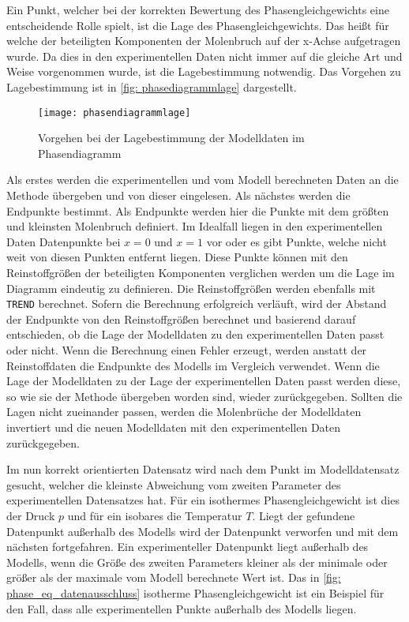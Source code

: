 \documentclass[../thesis.tex]{subfiles}
\begin{document}
Ein Punkt, welcher bei der korrekten Bewertung des Phasengleichgewichts eine entscheidende Rolle spielt, ist die Lage des Phasengleichgewichts. Das heißt für welche der beteiligten Komponenten der Molenbruch auf der x-Achse aufgetragen wurde. Da dies in den experimentellen Daten nicht immer auf die gleiche Art und Weise vorgenommen wurde, ist die Lagebestimmung notwendig. Das Vorgehen zu Lagebestimmung ist in \autoref{fig: phasediagrammlage} dargestellt.

\begin{figure}[htb]
	\centering
	\texttt{[image: phasendiagrammlage]}
	\caption{Vorgehen bei der Lagebestimmung der Modelldaten im Phasendiagramm}
	\label{fig: phasediagrammlage}
\end{figure}

Als erstes werden die experimentellen und vom Modell berechneten Daten an die Methode übergeben und von dieser eingelesen. Als nächstes werden die Endpunkte bestimmt. Als Endpunkte werden hier die Punkte mit dem größten und kleinsten Molenbruch definiert. Im Idealfall liegen in den experimentellen Daten Datenpunkte bei $x = 0$ und $ x = 1$ vor oder es gibt Punkte, welche nicht weit von diesen Punkten entfernt liegen. Diese Punkte können mit den Reinstoffgrößen der beteiligten Komponenten verglichen werden um die Lage im Diagramm eindeutig zu definieren. Die Reinstoffgrößen werden ebenfalls mit \texttt{TREND} berechnet. Sofern die Berechnung erfolgreich verläuft, wird der Abstand der Endpunkte von den Reinstoffgrößen berechnet und basierend darauf entschieden, ob die Lage der  Modelldaten zu den experimentellen Daten passt oder nicht. Wenn die Berechnung einen Fehler erzeugt, werden anstatt der Reinstoffdaten die Endpunkte des Modells im Vergleich verwendet. Wenn die Lage der Modelldaten zu der Lage der experimentellen Daten passt werden diese, so wie sie der Methode übergeben worden sind, wieder zurückgegeben. Sollten die Lagen nicht zueinander passen, werden die Molenbrüche der Modelldaten invertiert und die neuen Modelldaten mit den experimentellen Daten zurückgegeben.

Im nun korrekt orientierten Datensatz wird nach dem Punkt im Modelldatensatz gesucht, welcher die kleinste Abweichung vom zweiten Parameter des experimentellen Datensatzes hat. Für ein isothermes Phasengleichgewicht ist dies der Druck $p$ und für ein isobares die Temperatur $T$. Liegt der gefundene Datenpunkt außerhalb des Modells wird der Datenpunkt verworfen und mit dem nächsten fortgefahren. Ein experimenteller Datenpunkt liegt außerhalb des Modells, wenn die Größe des zweiten Parameters kleiner als der minimale oder größer als der maximale vom Modell berechnete Wert ist. Das in \autoref{fig: phase_eq_datenausschluss} isotherme Phasengleichgewicht ist ein Beispiel für den Fall, dass alle experimentellen Punkte außerhalb des Modells liegen. 
\end{document}
